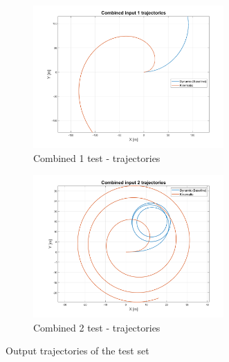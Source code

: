 \begin{figure}[H]
    \begin{subfigure}{.5\textwidth}
    \centering
  \includegraphics[width=0.8\textwidth,keepaspectratio]{Figures/Comb1_traj.png}
    \caption{Combined 1 test - trajectories}
    \label{subfig:Comb_1}
    \end{subfigure}%
    \begin{subfigure}{.5\textwidth}
    \centering
  \includegraphics[width=0.8\textwidth,keepaspectratio]{Figures/Comb2_traj.png}
    \caption{Combined 2 test - trajectories}
    \label{subfig:Comb_2}
    \end{subfigure}
    
    \caption{Output trajectories of the test set}
    \label{fig:trajectories}
\end{figure}
\pagebreak


